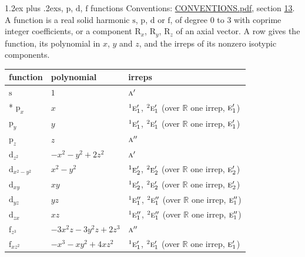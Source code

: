 \documentclass[10pt,a4paper]{article}
\makeatletter
\renewcommand\section{\@startsection{section}{1}{\z@}{-3ex plus -1ex minus -.2ex}%
  {1.2ex plus .2ex}{\normalfont\large\sffamily\bfseries\color{parttitle}}}
\numberwithin{equation}{section}
\newcommand{\irr}[1]{\text{\normalfont\scshape #1}}
\newcommand{\conjpair}[1]{{}^{#1}}
\newcommand{\orbital}[1]{\mathrm{#1}}
\makeatother
\begin{document}
\section{\texorpdfstring{$\orbital{s}$, $\orbital{p}$, $\orbital{d}$, $\orbital{f}$}{s, p, d, f} functions}\label{s:orbitals}
Conventions: \href{../../CONVENTIONS.pdf}{CONVENTIONS.pdf}, section \href{../../CONVENTIONS.pdf\#conv.13}{13}.
\leavevmode\label{n:head.function}A function is a real solid harmonic $\orbital{s}$, $\orbital{p}$, $\orbital{d}$ or $\orbital{f}$, of degree 0 to 3 with coprime integer coefficients, or a component $\orbital{R}_{x}$, $\orbital{R}_{y}$, $\orbital{R}_{z}$ of an axial vector. \label{n:head.polynomial}\label{n:head.irreps}A row gives the function, its polynomial in $x$, $y$ and $z$, and the irreps of its nonzero isotypic components.
{\small\begin{longtable}{@{}lll@{}}\toprule
function & polynomial & irreps\\\midrule\endhead
\bottomrule\endfoot\endlastfoot
$\orbital{s}$ & $1$ & $\irr{a}'$\\*
$\orbital{p}_{x}$ & $x$ & $\conjpair{1}\irr{e}_{1}'$, $\conjpair{2}\irr{e}_{1}'$ (over $\mathbb{R}$ one irrep, $\irr{e}_{1}'$)\\
$\orbital{p}_{y}$ & $y$ & $\conjpair{1}\irr{e}_{1}'$, $\conjpair{2}\irr{e}_{1}'$ (over $\mathbb{R}$ one irrep, $\irr{e}_{1}'$)\\
$\orbital{p}_{z}$ & $z$ & $\irr{a}''$\\
$\orbital{d}_{z^2}$ & $-x^{2} - y^{2} + 2z^{2}$ & $\irr{a}'$\\
$\orbital{d}_{x^2-y^2}$ & $x^{2} - y^{2}$ & $\conjpair{1}\irr{e}_{2}'$, $\conjpair{2}\irr{e}_{2}'$ (over $\mathbb{R}$ one irrep, $\irr{e}_{2}'$)\\
$\orbital{d}_{xy}$ & $xy$ & $\conjpair{1}\irr{e}_{2}'$, $\conjpair{2}\irr{e}_{2}'$ (over $\mathbb{R}$ one irrep, $\irr{e}_{2}'$)\\
$\orbital{d}_{yz}$ & $yz$ & $\conjpair{1}\irr{e}_{1}''$, $\conjpair{2}\irr{e}_{1}''$ (over $\mathbb{R}$ one irrep, $\irr{e}_{1}''$)\\
$\orbital{d}_{zx}$ & $xz$ & $\conjpair{1}\irr{e}_{1}''$, $\conjpair{2}\irr{e}_{1}''$ (over $\mathbb{R}$ one irrep, $\irr{e}_{1}''$)\\
$\orbital{f}_{z^3}$ & $-3x^{2}z - 3y^{2}z + 2z^{3}$ & $\irr{a}''$\\
$\orbital{f}_{xz^2}$ & $-x^{3} - xy^{2} + 4xz^{2}$ & $\conjpair{1}\irr{e}_{1}'$, $\conjpair{2}\irr{e}_{1}'$ (over $\mathbb{R}$ one irrep, $\irr{e}_{1}'$)\\

\end{longtable}}
\end{document}
